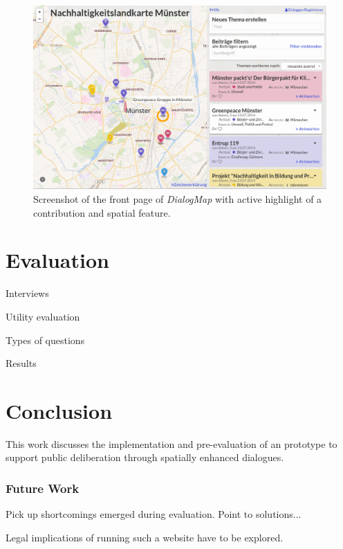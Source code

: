 \documentclass{sigchi}
\begin{document}
\begin{figure}[!h]
    \centering
    \includegraphics[width=0.9\columnwidth]{screenshot}
    \caption{Screenshot of the front page of \textit{DialogMap} with active highlight of a contribution and spatial feature.}
    \label{fig:screenshot}
\end{figure}


\section{Evaluation}



Interviews

Utility evaluation

Types of questions

Results

\section{Conclusion}

This work discusses the implementation and pre-evaluation of an prototype to support public deliberation through spatially enhanced dialogues.

\subsubsection{Future Work}
Pick up shortcomings emerged during evaluation. Point to solutions...

Legal implications of running such a website have to be explored.

\end{document}
